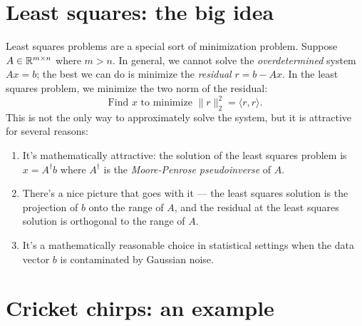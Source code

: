 \documentclass[12pt, leqno]{article}
\begin{document}

\section*{Least squares: the big idea}

Least squares problems are a special sort of minimization problem.
Suppose $A \in \mathbb{R}^{m \times n}$ where $m > n$.  In general, we
cannot solve the {\em overdetermined} system $Ax = b$; the best we can do is minimize the
{\em residual} $r = b-Ax$.  In the least squares problem, we minimize
the two norm of the residual:
\[
\mbox{Find } x \mbox{ to minimize } \|r\|_2^2 =
\langle r, r \rangle.
\]
This is not the only way to approximately solve the system, but it
is attractive for several reasons:
\begin{enumerate}
\item It's mathematically attractive: the solution of the least
  squares problem is $x = A^\dagger b$ where $A^\dagger$ is the {\em
    Moore-Penrose pseudoinverse} of $A$.
\item There's a nice picture that goes with it --- the least squares
  solution is the projection of $b$ onto the range of $A$, and the
  residual at the least squares solution is orthogonal to the range of
  $A$.
\item It's a mathematically reasonable choice in statistical settings
  when the data vector $b$ is contaminated by Gaussian noise.
\end{enumerate}

\section*{Cricket chirps: an example}
\end{document}
